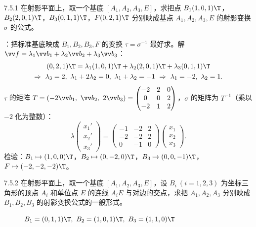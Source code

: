 
\begin{ex}{7.5.1}
在射影平面上，取一个基底 $[A_1,A_2,A_3,E]$，求把点 $B_1(1,0,1)\T$，$B_2(2,0,1)\T$，$B_3(0,1,1)\T$，$F(0,2,1)\T$ 分别映成基点 $A_1,A_2,A_3,E$ 的射影变换 $\sigma$ 的公式。
\end{ex}
\jie {}：把标准基底映成 $B_1,B_2,B_3,F$ 的变换 $\tau=\sigma^{-1}$ 最好求。解 $\vv f=\lambda_1\vv b_1+\lambda_2\vv b_2+\lambda_3\vv b_3$：
\begin{gather*}
(0,2,1)\T=\lambda_1(1,0,1)\T+\lambda_2(2,0,1)\T+\lambda_3(0,1,1)\T\\
\Rightarrow\ \lambda_3=2,\ \lambda_1+2\lambda_2=0,\ \lambda_1+\lambda_2=-1\ \Rightarrow\ \lambda_1=-2,\ \lambda_2=1 .
\end{gather*}
$\tau$ 的矩阵 $T=(-2\vv b_1,\ \vv b_2,\ 2\vv b_3)=\begin{pmatrix}-2&2&0\\0&0&2\\-2&1&2\end{pmatrix}$，$\sigma$ 的矩阵为 $T^{-1}$（乘以 $-2$ 化为整数）：
\[
\lambda\begin{pmatrix}x_1'\\x_2'\\x_3'\end{pmatrix}=\begin{pmatrix}-1&-2&2\\-2&-2&2\\0&-1&0\end{pmatrix}\begin{pmatrix}x_1\\x_2\\x_3\end{pmatrix}.
\]
检验：$B_1\mapsto(1,0,0)\T$，$B_2\mapsto(0,-2,0)\T$，$B_3\mapsto(0,0,-1)\T$，$F\mapsto(-2,-2,-2)\T$。\checkmark

\begin{ex}{7.5.2}
在射影平面上，取一个基底 $[A_1,A_2,A_3,E]$，设 $B_i\ (i=1,2,3)$ 为坐标三角形的顶点 $A_i$ 和单位点 $E$ 的连线 $A_iE$ 与对边的交点，求把 $A_1,A_2,A_3$ 分别映成 $B_1,B_2,B_3$ 的射影变换公式的一般形式。
\end{ex}

\begin{figure}[htbp]
\centering
{}
\caption{$B_1=(0,1,1)\T,\ B_2=(1,0,1)\T,\ B_3=(1,1,0)\T$}
\end{figure}

